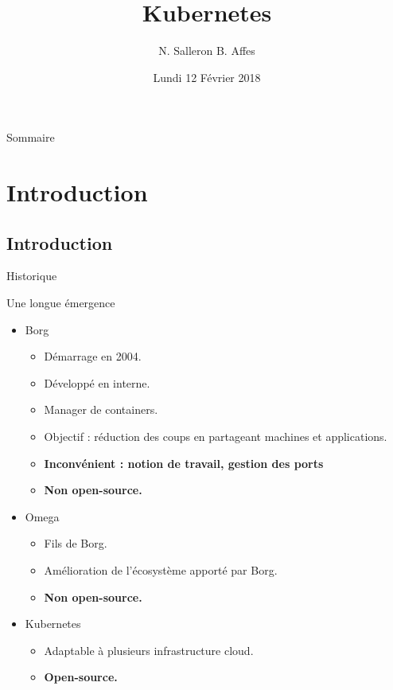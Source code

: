 \documentclass{bredelebeamer}
\title[Kubernetes]{Kubernetes}
\subtitle{ }
\author{N. Salleron B. Affes}
\date{Lundi 12 Février 2018}
\begin{document}
\begin{frame}
  \titlepage
\end{frame}

\begin{frame}{Sommaire}
  \tableofcontents
\end{frame}

\section{Introduction}
\subsection{Introduction}

\begin{frame}{Historique}
\begin{block}{Une longue émergence}
\begin{itemize}
\item Borg
	\begin{itemize}
	\item Démarrage en 2004.
	\item Développé en interne.
	\item Manager de containers.
	\item Objectif : réduction des coups en partageant machines et applications.
	\item \textbf{Inconvénient : notion de travail, gestion des ports}
	\item \textbf{Non open-source.}
	\end{itemize}	\pause
\item Omega	
	\begin{itemize}
	\item Fils de Borg.
	\item Amélioration de l'écosystème apporté par Borg.
	\item  \textbf{Non open-source.}
	\end{itemize}   \pause
\item Kubernetes
	\begin{itemize}
	\item Adaptable à plusieurs infrastructure cloud.
	\item  \textbf{Open-source.}
	\end{itemize}
\end{itemize}
\end{block}
\end{frame}
\end{document}

